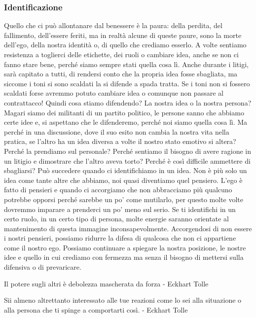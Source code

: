 \documentclass[12pt]{book} %
\begin{document}
\subsubsection{Identificazione}
Quello che ci può allontanare dal benessere è la paura: della perdita, del fallimento,
dell'essere feriti, ma in realtà alcune di queste paure, sono la morte dell'ego, della nostra identità o, di quello che crediamo esserlo. A volte sentiamo
resistenza a toglierci delle etichette, dei ruoli o cambiare idea, anche se non ci fanno stare bene, perché siamo
sempre stati quella cosa lì. Anche durante i litigi, sarà capitato a tutti, di rendersi conto che la propria idea fosse
sbagliata, ma siccome i toni si sono scaldati la si difende a spada tratta. Se i toni non si fossero scaldati forse
avremmo potuto cambiare idea o comunque non passare al contrattacco! Quindi cosa stiamo difendendo? La nostra idea o la
nostra persona? Magari siamo dei militanti di
un partito politico, le persone sanno che abbiamo certe idee e, si aspettano che le difenderemo, perché noi
siamo quella cosa lì. Ma perché in una discussione, dove il suo esito non cambia la nostra vita nella pratica, se
l'altro ha un idea diversa a volte il nostro stato emotivo si altera? Perché la prendiamo sul personale? Perché sentiamo il bisogno di avere ragione in un litigio e dimostrare
che l'altro aveva torto? Perché
è così difficile ammettere di sbagliarsi? Può succedere quando ci identifichiamo in un idea. Non è più solo
un idea come tante altre che abbiamo, noi quasi diventiamo quel pensiero. L'ego è fatto di pensieri
e quando ci accorgiamo che non abbracciamo più qualcuno potrebbe opporsi perché sarebbe un po' come mutilarlo, per questo molte volte
dovremmo imparare a prenderci un po' meno sul serio. Se ti identifichi in un certo ruolo, in un
certo tipo di persona, molte energie saranno orientate al mantenimento di questa immagine inconsapevolmente. Accorgendosi di non essere i nostri pensieri, possiamo ridurre la difesa di qualcosa che non ci
appartiene come il nostro ego. Possiamo continuare a spiegare la nostra posizione, le nostre idee
e quello in cui crediamo con fermezza ma senza il bisogno di mettersi sulla difensiva o di prevaricare.

Il potere sugli altri è debolezza mascherata da forza - Eckhart Tolle

Sii almeno altrettanto interessato alle tue reazioni come lo sei alla situazione o alla persona che ti spinge a
comportarti così. - Eckhart Tolle
\end{document}
